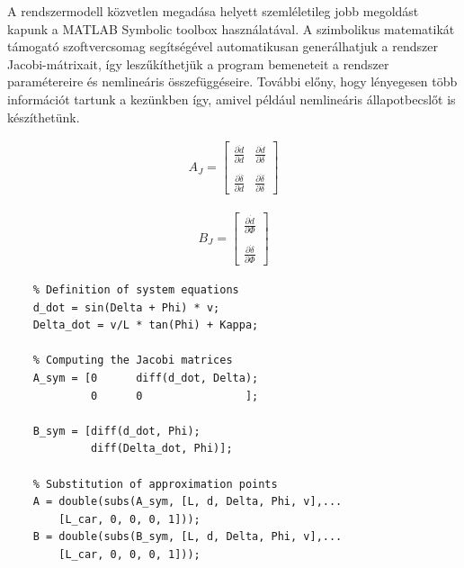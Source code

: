 A rendszermodell közvetlen megadása helyett szemléletileg jobb megoldást kapunk a MATLAB Symbolic toolbox használatával. A szimbolikus matematikát támogató szoftvercsomag segítségével automatikusan generálhatjuk a rendszer Jacobi-mátrixait, így leszűkíthetjük a program bemeneteit a rendszer paramétereire és nemlineáris összefüggéseire. További előny, hogy lényegesen több információt tartunk a kezünkben így, amivel például nemlineáris állapotbecslőt is készíthetünk.
     
\begin{minipage}{0.45\linewidth}
    \begin{align}
        A_J =
        \begin{bmatrix}
           \frac{\partial \dot{d}}{\partial d} & \frac{\partial \dot{d}}{\partial \delta} \\
           & \\
           \frac{\partial \dot{\delta}}{\partial d} & \frac{\partial \dot{\delta}}{\partial \delta}
         \end{bmatrix}
     \end{align}
\end{minipage}
\begin{minipage}{0.45\linewidth}
    \begin{align}
        B_J =
         \begin{bmatrix}
               \frac{\partial \dot{d}}{\partial \Phi} \\
               \\
               \frac{\partial \dot{\delta}}{\partial \Phi}
        \end{bmatrix}
     \end{align}
\end{minipage}

\begin{lstlisting}
    % Definition of system equations
    d_dot = sin(Delta + Phi) * v;
    Delta_dot = v/L * tan(Phi) + Kappa;
    
    % Computing the Jacobi matrices
    A_sym = [0      diff(d_dot, Delta);
             0      0                ];
       
    B_sym = [diff(d_dot, Phi);
             diff(Delta_dot, Phi)];
    
    % Substitution of approximation points
    A = double(subs(A_sym, [L, d, Delta, Phi, v],...
        [L_car, 0, 0, 0, 1]));
    B = double(subs(B_sym, [L, d, Delta, Phi, v],...
        [L_car, 0, 0, 0, 1]));
\end{lstlisting}

